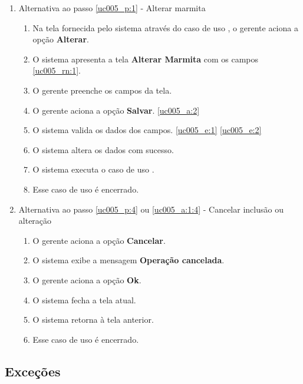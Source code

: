 \begin{enumerate}[label=A\arabic*]
	\item Alternativa ao passo \ref{uc005_p:1} - Alterar marmita \label{uc005_a:1}
	\begin{enumerate}[label*=.\arabic*]
		\item Na tela fornecida pelo sistema através do caso de uso , o gerente aciona a opção \textbf{Alterar}. 
		\item O sistema apresenta a tela \textbf{Alterar Marmita} com os campos \ref{uc005_rn:1}. \label{uc005_a:1:2}
		\item O gerente preenche os campos da tela. \label{uc005_a:1:3}
		\item O gerente aciona a opção \textbf{Salvar}. \label{uc005_a:1:4}\ref{uc005_a:2}
		\item O sistema valida os dados dos campos. \ref{uc005_e:1} \ref{uc005_e:2}
		\item O sistema altera os dados com sucesso.
		\item O sistema executa o caso de uso .
		\item Esse caso de uso é encerrado.
	\end{enumerate}
	
	\item Alternativa ao passo \ref{uc005_p:4} ou \ref{uc005_a:1:4} - Cancelar inclusão ou alteração \label{uc005_a:2}
	\begin{enumerate}[label*=.\arabic*]
		\item O gerente aciona a opção \textbf{Cancelar}.
		\item O sistema exibe a mensagem \textbf{Operação cancelada}.
		\item O gerente aciona a opção \textbf{Ok}.
		\item O sistema fecha a tela atual.
		\item O sistema retorna à tela anterior.
		\item Esse caso de uso é encerrado.
	\end{enumerate}	 	
\end{enumerate}

\subsection{Exceções}


